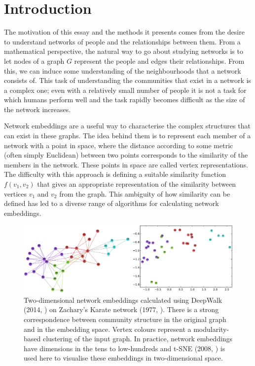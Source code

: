 \documentclass[a4paper]{article}
\begin{document}


\tableofcontents

\section{Introduction}
The motivation of this essay and the methods it presents comes from the desire to understand networks of people and the relationships between them.
From a mathematical perspective, the natural way to go about studying networks is to let nodes of a graph $G$ represent the people and edges their relationships.
From this, we can induce some understanding of the neighbourhoods that a network consists of. This task of understanding the communities that exist in a network is a complex one; 
even with a relatively small number of people it is not a task for which humans perform well and the task rapidly becomes difficult as the size of the network increases.\par
Network embeddings are a useful way to characterise the complex structures that
can exist in these graphs. The idea behind them is to represent each member of a
network with a point in space, where the distance according to some metric
(often simply Euclidean) between two points corresponds to the similarity of
the members in the network. These points in space are called vertex
representations. The difficulty with this approach is defining a suitable
similarity function $f(v_1,v_2)$ that gives an appropriate representation of the similarity between vertices $v_1$ and $v_2$ from the graph. This ambiguity of how similarity can be defined has led to a diverse range of algorithms for calculating network embeddings.

\begin{figure}[h!]
  \centering
  \includegraphics[width = 1\textwidth]{src/DeepWalkOnKarateGraph.png}

  \caption{Two-dimensional network embeddings calculated using
    DeepWalk (2014, \cite{deepwalk}) on Zachary's Karate network (1977, \cite{zachary1977}). There is a strong
    correspondence between community structure in the original graph and
    in the embedding space. Vertex colours represent a modularity-based
    clustering of the input graph. In practice, network embeddings have dimensions
    in the tens to low-hundreds and t-SNE (2008, \cite{maaten2008}) is used here to visualise these embeddings in two-dimensional
    space.}
\end{figure}
\end{document}
